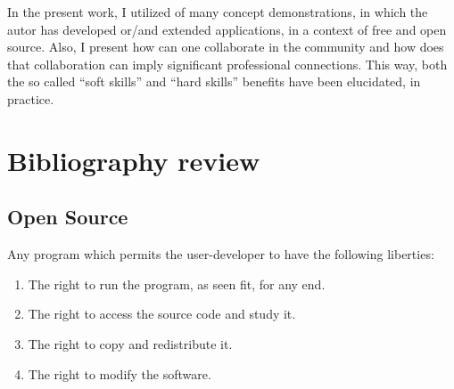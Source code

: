 \documentclass[
12pt,				%
openright,			%
oneside,			%
a4paper,			%
brazil,				%
english,			%
]{abntex2}
\begin{document}
In the present work, I utilized of many concept demonstrations, in
which the autor has developed or/and extended applications, in a
context of free and open source. Also, I present how can one
collaborate in the community and how does that collaboration can imply
significant professional connections. This way, both the so called
``soft skills'' and ``hard skills'' benefits have been elucidated, in practice.  


\chapter{Bibliography review}
\section{Open Source}
\label{sec:opensource}

Any program which permits the user-developer to have the following liberties:
\begin{enumerate}
\item The right to run the program, as seen fit, for any end.
\item The right to access the source code and study it.
\item The right to copy and redistribute it.
\item The right to modify the software.
\end{enumerate}


\end{document}

